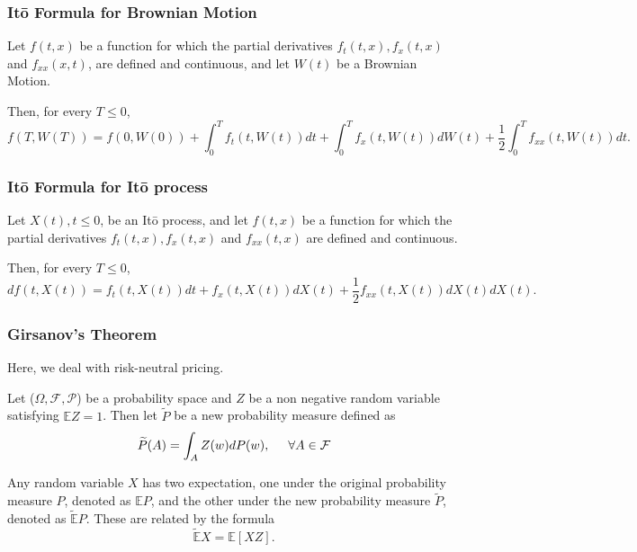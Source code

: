\documentclass[paper=a4, fontsize=12pt]{scrartcl} %
\numberwithin{equation}{section}
\begin{document}
\subsubsection{It\={o} Formula for Brownian Motion}
Let $f(t,x)$ be a function for which the partial derivatives $f_t (t,x), f_x (t,x)$ and $f_{xx}(x,t)$, are defined and continuous, and let $W(t)$ be a Brownian Motion.\par
Then, for every $T \leq 0$, 
	\begin{equation}
		f(T,W(T)) = f(0, W(0)) + \int_0^T f_t (t, W(t)) dt + \int_0^T f_x (t, W(t)) dW(t) + \frac{1}{2} \int_0^T f_{xx} (t, W(t)) dt.
	\end{equation}

\subsubsection{It\={o} Formula for It\={o} process}
Let $X(t), t \leq 0$, be an It\={o} process, and let $f(t, x)$ be a function for which the partial derivatives $f_t(t, x), f_x(t, x)$ and $f_{xx} (t, x)$ are defined and continuous. \par
Then, for every $T \leq 0$, 
	\begin{equation}
		df(t, X(t)) = f_t (t, X(t)) dt + f_x (t, X(t)) dX(t) + \frac{1}{2} f_{xx} (t, X(t)) dX(t)dX(t).
	\end{equation}

\subsubsection{Girsanov's Theorem}
Here, we deal with risk-neutral pricing.	\par
Let ($\Omega, \mathcal{F}, \mathcal{P}$) be a probability space and $Z$ be a non negative random variable satisfying $\mathbb{E}Z = 1$. Then let $\widetilde{P}$ be a new probability measure defined as
	\begin{equation}
		\widetilde{P}(A) = \int_A Z(w)dP(w), \hspace{0.5cm} \forall A \in \mathcal{F}
	\end{equation}

Any random variable $X$ has two expectation, one under the original probability measure $P$, denoted as $\mathbb{E}P$, and the other under the new probability measure $\widetilde{P}$, denoted as $\widetilde{\mathbb{E}}P$.
These are related by the formula 
	\begin{equation}
		\widetilde{\mathbb{E}}X = \mathbb{E}[XZ].
	\end{equation}
\end{document}
